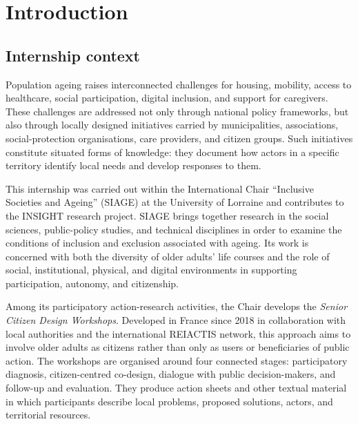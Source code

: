 \documentclass[
11pt,
english,
singlespacing,
headsepline,
]{MastersDoctoralThesis}
\begin{document}

\dedicatory{} 


\mainmatter

\pagestyle{thesis}

\chapter{Introduction}

\section{Internship context}

Population ageing raises interconnected challenges for housing, mobility, access
to healthcare, social participation, digital inclusion, and support for caregivers.
These challenges are addressed not only through national policy frameworks, but
also through locally designed initiatives carried by municipalities, associations,
social-protection organisations, care providers, and citizen groups. Such
initiatives constitute situated forms of knowledge: they document how actors in a
specific territory identify local needs and develop responses to them.

This internship was carried out within the International Chair ``Inclusive
Societies and Ageing'' (SIAGE) at the University of Lorraine and contributes to
the INSIGHT research project. SIAGE brings together research in the social
sciences, public-policy studies, and technical disciplines in order to examine the
conditions of inclusion and exclusion associated with ageing. Its work is concerned
with both the diversity of older adults' life courses and the role of social,
institutional, physical, and digital environments in supporting participation,
autonomy, and citizenship.

Among its participatory action-research activities, the Chair develops the
\textit{Senior Citizen Design Workshops}. Developed in France since 2018 in
collaboration with local authorities and the international REIACTIS network, this
approach aims to involve older adults as citizens rather than only as users or
beneficiaries of public action. The workshops are organised around four connected
stages: participatory diagnosis, citizen-centred co-design, dialogue with public
decision-makers, and follow-up and evaluation. They produce action sheets and
other textual material in which participants describe local problems, proposed
solutions, actors, and territorial resources.
\end{document}
